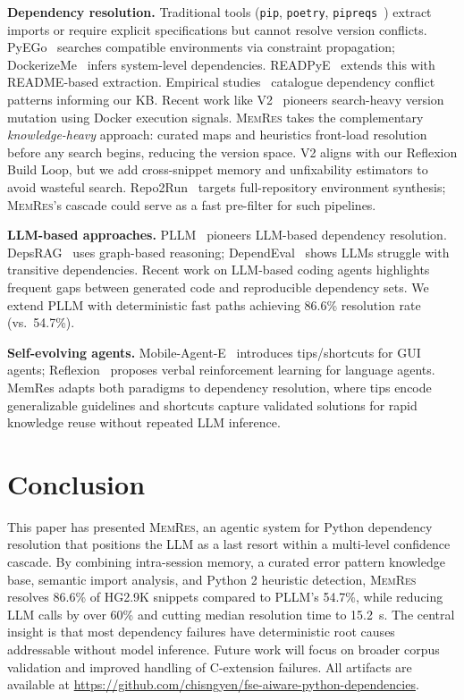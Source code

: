 \documentclass[sigconf,screen]{acmart}
\begin{document}
\textbf{Dependency resolution.}
Traditional tools (\texttt{pip}, \texttt{poetry}, \texttt{pipreqs}~\cite{pipreqs}) extract imports or require explicit specifications but cannot resolve version conflicts.
PyEGo~\cite{ye2022pyego} searches compatible environments via constraint propagation; DockerizeMe~\cite{horton2019} infers system-level dependencies.
READPyE~\cite{readpye2024} extends this with README-based extraction.
Empirical studies~\cite{jia2024,jia2024qrs} catalogue dependency conflict patterns informing our KB.
Recent work like V2~\cite{horton2022v2} pioneers search-heavy version mutation using Docker execution signals.
\textsc{MemRes} takes the complementary \emph{knowledge-heavy} approach: curated maps and heuristics front-load resolution before any search begins, reducing the version space.
V2 aligns with our Reflexion Build Loop, but we add cross-snippet memory and unfixability estimators to avoid wasteful search.
Repo2Run~\cite{repo2run2025} targets full-repository environment synthesis; \textsc{MemRes}'s cascade could serve as a fast pre-filter for such pipelines.

\textbf{LLM-based approaches.}
PLLM~\cite{bartlett2025} pioneers LLM-based dependency resolution.
DepsRAG~\cite{depsrag2024} uses graph-based reasoning; DependEval~\cite{dependeval2025} shows LLMs struggle with transitive dependencies.
Recent work on LLM-based coding agents highlights frequent gaps between generated code and reproducible dependency sets.
We extend PLLM with deterministic fast paths achieving 86.6\% resolution rate (vs.\ 54.7\%).

\textbf{Self-evolving agents.}
Mobile-Agent-E~\cite{wang2025} introduces tips/shortcuts for GUI agents; Reflexion~\cite{shinn2023} proposes verbal reinforcement learning for language agents.
MemRes adapts both paradigms to dependency resolution, where tips encode generalizable guidelines and shortcuts capture validated solutions for rapid knowledge reuse without repeated LLM inference.

\section{Conclusion}
\label{sec:conclusion}

This paper has presented \textsc{MemRes}, an agentic system for Python dependency resolution that positions the LLM as a last resort within a multi-level confidence cascade. By combining intra-session memory, a curated error pattern knowledge base, semantic import analysis, and Python 2 heuristic detection, \textsc{MemRes} resolves 86.6\% of HG2.9K snippets compared to PLLM's 54.7\%, while reducing LLM calls by over 60\% and cutting median resolution time to 15.2~s. The central insight is that most dependency failures have deterministic root causes addressable without model inference. Future work will focus on broader corpus validation and improved handling of C-extension failures. All artifacts are available at \small\url{https://github.com/chisngyen/fse-aiware-python-dependencies}\normalsize.
\end{document}
